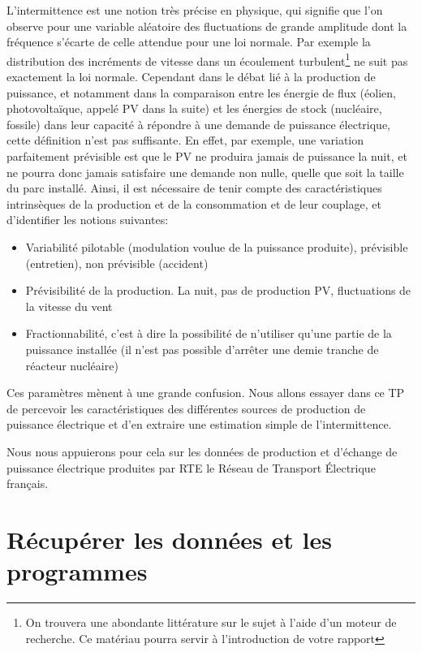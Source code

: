 \documentclass[12pt,a4]{article}
\begin{document}
L'intermittence est une notion très précise en physique, qui signifie que
l'on observe pour une variable aléatoire des fluctuations de grande amplitude dont la fréquence s'écarte de celle attendue pour une loi normale. Par exemple la distribution des incréments de vitesse dans un écoulement turbulent\footnote{On trouvera une abondante littérature sur le sujet à l'aide d'un moteur de recherche. Ce matériau pourra servir à l'introduction de votre rapport} ne suit pas exactement la loi normale.
Cependant dans le débat lié à
la production de puissance, et notamment dans la comparaison entre les
énergie de flux (éolien, photovoltaïque, appelé PV dans la suite) et les énergies de stock (nucléaire,
fossile) dans leur capacité à répondre à une demande de puissance
électrique, cette définition n'est pas suffisante. En effet, par exemple,
une variation parfaitement prévisible est que le PV ne produira jamais de
puissance la nuit, et ne pourra donc jamais satisfaire une demande non nulle, quelle que
soit la taille du parc installé. Ainsi, il est nécessaire de tenir compte
des caractéristiques intrinsèques de la production et de la consommation et
de leur couplage, et d'identifier les notions suivantes:
\begin{itemize}
  \item Variabilité pilotable (modulation voulue de la puissance produite), prévisible (entretien), non prévisible (accident)
  
  \item Prévisibilité de la production. La nuit, pas de production PV, fluctuations de la vitesse du vent
  
  \item Fractionnabilité, c'est à dire la possibilité de n'utiliser qu'une
  partie de la puissance installée (il n'est pas possible d'arrêter une demie tranche de réacteur nucléaire)  
\end{itemize}
Ces paramètres mènent à une grande confusion. Nous allons essayer dans ce
TP de percevoir les caractéristiques des différentes sources de production
de puissance électrique et d'en extraire une estimation simple de
l'intermittence.

Nous nous appuierons pour cela sur les données de production et d'échange de puissance électrique produites par RTE le Réseau de Transport Électrique français.


\section{Récupérer les données et les programmes}
\end{document}
